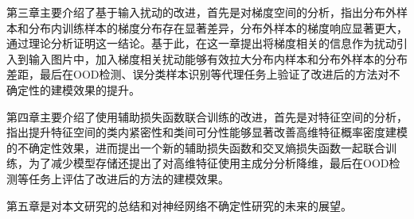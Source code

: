 第三章主要介绍了基于输入扰动的改进，首先是对梯度空间的分析，指出分布外样本和分布内训练样本的梯度分布存在显著差异，分布外样本的梯度响应显著更大，通过理论分析证明这一结论。基于此，在这一章提出将梯度相关的信息作为扰动引入到输入图片中，加入梯度相关扰动能够有效拉大分布内样本和分布外样本的分布差距，最后在OOD检测、误分类样本识别等代理任务上验证了改进后的方法对不确定性的建模效果的提升。

第四章主要介绍了使用辅助损失函数联合训练的改进，首先是对特征空间的分析，指出提升特征空间的类内紧密性和类间可分性能够显著改善高维特征概率密度建模的不确定性效果，进而提出一个新的辅助损失函数和交叉熵损失函数一起联合训练，为了减少模型存储还提出了对高维特征使用主成分分析降维，最后在OOD检测等任务上评估了改进后的方法的建模效果。

第五章是对本文研究的总结和对神经网络不确定性研究的未来的展望。

